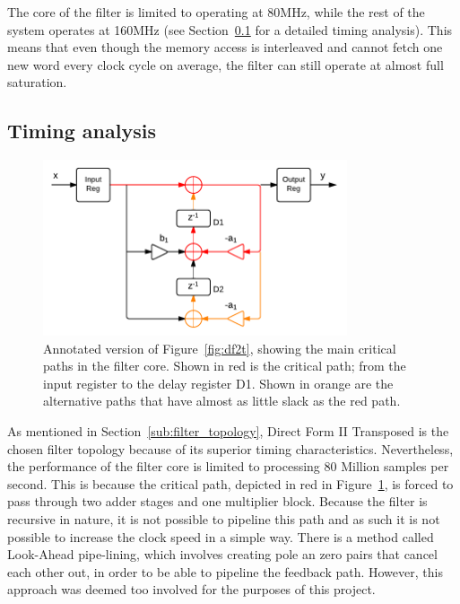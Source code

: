 \documentclass[]{article}
\begin{document}
The core of the filter is limited to operating at 80MHz, while the rest of the system operates at 160MHz (see Section~\ref{sub:timing_analysis} for a detailed timing analysis). This means that even though the memory access is interleaved and cannot fetch one new word every clock cycle on average, the filter can still operate at almost full saturation.



\subsection{Timing analysis} %
\label{sub:timing_analysis}

\begin{figure}[htbp]
	\begin{center}
		\includegraphics[width = 0.8\textwidth]{DirectFormIITransposedCritpath.pdf}
	\end{center}
	\caption{Annotated version of Figure~\ref{fig:df2t}, showing the main critical paths in the filter core. Shown in red is the critical path; from the input register to the delay register D1. Shown in orange are the alternative paths that have almost as little slack as the red path.}
	\label{fig:df2tCritpath}
\end{figure}

As mentioned in Section~\ref{sub:filter_topology}, Direct Form II Transposed is the chosen filter topology because of its superior timing characteristics. Nevertheless, the performance of the filter core is limited to processing 80 Million samples per second.
This is because the critical path, depicted in red in Figure~\ref{fig:df2tCritpath}, is forced to pass through two adder stages and one multiplier block.
Because the filter is recursive in nature, it is not possible to pipeline this path and as such it is not possible to increase the clock speed in a simple way. There is a method called Look-Ahead pipe-lining, which involves creating pole an zero pairs that cancel each other out, in order to be able to pipeline the feedback path.
However, this approach was deemed too involved for the purposes of this project.
\end{document}
